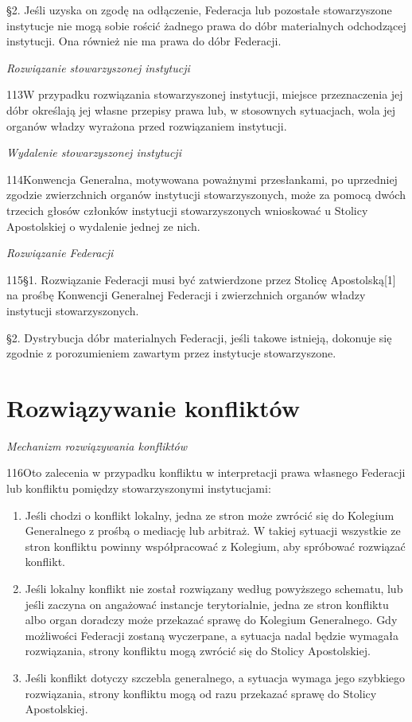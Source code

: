 ﻿\documentclass{book}
\newcommand{\lett}[1]{\lettrine[findent=6pt]{#1}}
\newcommand{\ssec}[1]{\vspace{1em}\textit{#1}\vspace{.5em}\nopagebreak}
\begin{document}
\S{}2. Jeśli uzyska on zgodę na odłączenie, Federacja lub pozostałe stowarzyszone instytucje nie mogą sobie rościć żadnego prawa do dóbr materialnych odchodzącej instytucji. Ona również nie ma prawa do dóbr Federacji.
 
\ssec{Rozwiązanie stowarzyszonej instytucji}


\lett{113} W przypadku rozwiązania stowarzyszonej instytucji, miejsce przeznaczenia jej dóbr określają jej własne przepisy prawa lub, w stosownych sytuacjach, wola jej organów władzy wyrażona przed rozwiązaniem instytucji.
 
\ssec{Wydalenie stowarzyszonej instytucji}


\lett{114} Konwencja Generalna, motywowana poważnymi przesłankami, po uprzedniej zgodzie zwierzchnich organów instytucji stowarzyszonych, może za pomocą dwóch trzecich głosów członków instytucji stowarzyszonych wnioskować u Stolicy Apostolskiej o wydalenie jednej ze nich.
 
\ssec{Rozwiązanie Federacji}


\lett{115} \S{}1. Rozwiązanie Federacji musi być zatwierdzone przez Stolicę Apostolską[1] na prośbę Konwencji Generalnej Federacji i zwierzchnich organów władzy instytucji stowarzyszonych.


\S{}2. Dystrybucja dóbr materialnych Federacji, jeśli takowe istnieją, dokonuje się zgodnie z porozumieniem zawartym przez instytucje stowarzyszone.


\chapter{Rozwiązywanie konfliktów}


\ssec{Mechanizm rozwiązywania konfliktów}


\lett{116} Oto zalecenia w przypadku konfliktu w interpretacji prawa własnego Federacji lub konfliktu pomiędzy stowarzyszonymi instytucjami:


\begin{enumerate}


\item Jeśli chodzi o konflikt lokalny, jedna ze stron może zwrócić się do Kolegium Generalnego z prośbą o mediację lub arbitraż. W takiej sytuacji wszystkie ze stron konfliktu powinny współpracować z Kolegium, aby spróbować rozwiązać konflikt.


\item Jeśli lokalny konflikt nie został rozwiązany według powyższego schematu, lub jeśli zaczyna on angażować instancje terytorialnie, jedna ze stron konfliktu albo organ doradczy może przekazać sprawę do Kolegium Generalnego. Gdy możliwości Federacji zostaną wyczerpane, a sytuacja nadal będzie wymagała rozwiązania, strony konfliktu mogą zwrócić się do Stolicy Apostolskiej.


\item Jeśli konflikt dotyczy szczebla generalnego, a sytuacja wymaga jego szybkiego rozwiązania, strony konfliktu mogą od razu przekazać sprawę do Stolicy Apostolskiej.


\end{enumerate}
 
\end{document}
